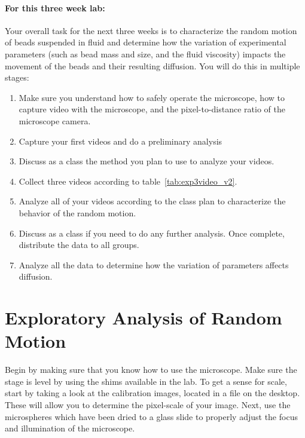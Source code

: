 \paragraph{For this three week lab:} Your overall task for the next three weeks is to characterize the random motion of beads suspended in fluid and determine how the variation of experimental parameters (such as bead mass and size, and the fluid viscosity) impacts the movement of the beads and their resulting diffusion.
You will do this in multiple stages:
\begin{enumerate}
\itemsep-0.2em
\item Make sure you understand how to safely operate the microscope, how to capture video with the microscope, and the pixel-to-distance ratio of the microscope camera.
\item Capture your first videos and do a preliminary analysis
\item Discuss as a class the method you plan to use to analyze your videos.
\item Collect three videos according to table~\ref{tab:exp3video_v2}.
\item Analyze all of your videos according to the class plan to characterize the behavior of the random motion.
\item Discuss as a class if you need to do any further analysis. Once complete, distribute the data to all groups.
\item Analyze all the data to determine how the variation of parameters affects diffusion.
\end{enumerate}

\section{Exploratory Analysis of Random Motion}
Begin by making sure that you know how to use the microscope.
Make sure the stage is level by using the shims available in the lab.
To get a sense for scale, start by taking a look at the calibration images, located in a file on the desktop.
These will allow you to determine the pixel-scale of your image.
Next, use the microspheres which have been dried to a glass slide to properly adjust the focus and illumination of the microscope.
